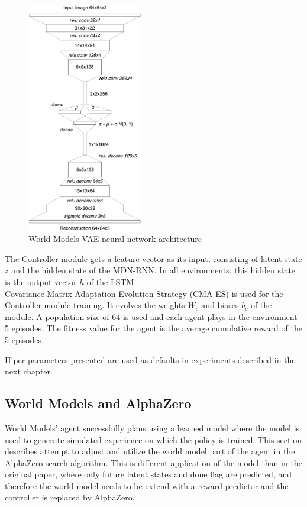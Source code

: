 \begin{figure}[H]
\includegraphics[width=0.45\textwidth,keepaspectratio]{figures/WorldModels/world_models_vae_architecture.png}
\caption{World Models VAE neural network architecture \cite{Algo.WorldModels}}
\label{Fig.WorldModelsVAEArchitecture}
\end{figure}

The Controller module gets a feature vector as its input, consisting of latent state $z$ and the hidden state of the MDN-RNN. In all environments, this hidden state is the output vector $h$ of the LSTM. \\
Covariance-Matrix Adaptation Evolution Strategy (CMA-ES) \cite{Algo.CMAES} is used for the Controller module training. It evolves the weights $W_c$ and biases $b_c$ of the module. A population size of 64 is used and each agent plays in the environment 5 episodes. The fitness value for the agent is the average cumulative reward of the 5 episodes.

Hiper-parameters presented are used as defaults in experiments described in the next chapter.

\subsection{World Models and AlphaZero}

World Models' agent \cite{Algo.WorldModels} successfully plans using a learned model where the model is used to generate simulated experience on which the policy is trained. This section describes attempt to adjust and utilize the world model part of the agent in the AlphaZero search algorithm. This is different application of the model than in the original paper, where only future latent states and done flag are predicted, and therefore the world model needs to be extend with a reward predictor and the controller is replaced by AlphaZero.

